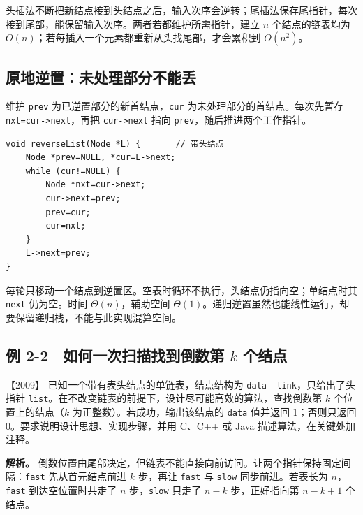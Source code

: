 头插法不断把新结点接到头结点之后，输入次序会逆转；尾插法保存尾指针，每次接到尾部，能保留输入次序。两者若都维护所需指针，建立 \(n\) 个结点的链表均为 \(O(n)\)；若每插入一个元素都重新从头找尾部，才会累积到 \(O(n^2)\)。

\subsection{原地逆置：未处理部分不能丢}\label{ds-c02-h52}

维护 \texttt{prev} 为已逆置部分的新首结点，\texttt{cur} 为未处理部分的首结点。每次先暂存 \texttt{nxt=cur-\textgreater{}next}，再把 \texttt{cur-\textgreater{}next} 指向 \texttt{prev}，随后推进两个工作指针。

\par\medskip\noindent
\begin{minipage}{\linewidth}
\begin{verbatim}
void reverseList(Node *L) {       // 带头结点
    Node *prev=NULL, *cur=L->next;
    while (cur!=NULL) {
        Node *nxt=cur->next;
        cur->next=prev;
        prev=cur;
        cur=nxt;
    }
    L->next=prev;
}
\end{verbatim}
\end{minipage}\par\medskip

每轮只移动一个结点到逆置区。空表时循环不执行，头结点仍指向空；单结点时其 \texttt{next} 仍为空。时间 \(\Theta(n)\)，辅助空间 \(\Theta(1)\)。递归逆置虽然也能线性运行，却要保留递归栈，不能与此实现混算空间。

\subsection{\texorpdfstring{例 2-2　如何一次扫描找到倒数第 \(k\) 个结点}{例 2-2　如何一次扫描找到倒数第 k 个结点}}\label{ds-ex2-2}

\noindent{}【2009】 已知一个带有表头结点的单链表，结点结构为 \texttt{data\ \textbar{}\ link}，只给出了头指针 \texttt{list}。在不改变链表的前提下，设计尽可能高效的算法，查找倒数第 \(k\) 个位置上的结点（\(k\) 为正整数）。若成功，输出该结点的 \texttt{data} 值并返回 1；否则只返回 0。要求说明设计思想、实现步骤，并用 C、C++ 或 Java 描述算法，在关键处加注释。


\textbf{解析。} 倒数位置由尾部决定，但链表不能直接向前访问。让两个指针保持固定间隔：\texttt{fast} 先从首元结点前进 \(k\) 步，再让 \texttt{fast} 与 \texttt{slow} 同步前进。若表长为 \(n\)，\texttt{fast} 到达空位置时共走了 \(n\) 步，\texttt{slow} 只走了 \(n-k\) 步，正好指向第 \(n-k+1\) 个结点。


